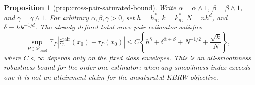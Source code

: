 \documentclass{article}
\newtheorem{proposition}{Proposition}
\begin{document}
\begin{proposition}[prop:cross-pair-saturated-bound]\label{prop:cross-pair-saturated-bound}
Write \(\bar\alpha=\alpha\wedge1\), \(\bar\beta=\beta\wedge1\), and \(\bar\gamma=\gamma\wedge1\).  For arbitrary \(\alpha,\beta,\gamma>0\), set \(h=h_n^*\), \(k=k_n^*\), \(N=nh^d\), and \(\delta=hk^{-1/d}\).  The already-defined total cross-pair estimator satisfies
\[
 \sup_{P\in\mathcal P_{\mathrm{band}}}
 \mathbb E_P\left|\widehat\tau_n^{\mathrm{pair}}(x_0)-\tau_P(x_0)\right|
 \leq C\left\{h^{\bar\gamma}+\delta^{\bar\alpha+\bar\beta}+N^{-1/2}+\frac{\sqrt{k}}{N}\right\},
\]
where \(C<\infty\) depends only on the fixed class envelopes.  This is an all-smoothness robustness bound for the order-one estimator; when any smoothness index exceeds one it is not an attainment claim for the unsaturated KBRW objective.
\end{proposition}
\end{document}
